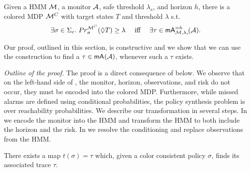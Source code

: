 \documentclass[runningheads]{llncs}
\newcommand{\missedalarms}[2]{\mathsf{mA}_{#1}^{#2}}
\newcommand{\ccSched}{\Sigma_c}
\renewcommand{\paragraph}[1]{\smallskip\noindent\emph{#1}}
\begin{document}
\begin{theorem}
    \label{thm:maintheorem}
    Given a HMM $\mathcal{M}$, a monitor $\mathcal{A}$, safe threshold $\lambda_s$, and horizon $h$, there is a colored MDP $\mathcal{M}^{C}$ with target states $T$ and threshold $\lambda$ s.t.\
    \[ \exists \sigma \in \ccSched.\ \Prob^{\mdpc}_{\sigma}(\lozenge T) \geq \lambda\quad\text{ iff }\quad \exists \tau\in \missedalarms{\mc,\lambda_s}{= h}\!(\dfa).\]
\end{theorem}
Our proof, outlined in this section, is constructive and we show that we can use the construction to find a $\tau \in \missedalarms{}{}(\dfa)$, whenever such a $\tau$ exists.

\paragraph{Outline of the proof.}
The proof is a direct consequence of  below. We observe that on the left-hand side of , the monitor, horizon, observations, and risk do not occur, they must be encoded into the colored MDP.
Furthermore, while missed alarms are defined using conditional probabilities,  the policy synthesis problem is over reachability probabilities.
We describe our transformation in several steps. In \Cref{ssec:ctp} we encode the monitor into the HMM and transform the HMM to both include the horizon and the risk. In  we resolve the conditioning and replace observations from the HMM.

\begin{corollary}
    There exists a map $t(\sigma) = \tau$ which, given a color consistent policy $\sigma$, finds its associated trace $\tau$.
\end{corollary}
\end{document}
